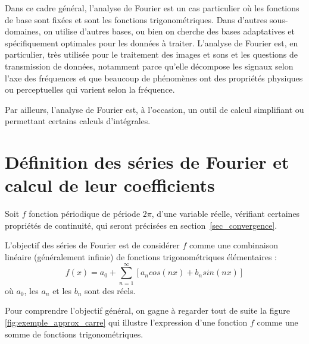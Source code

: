 Dans ce cadre général, l'analyse de Fourier est un cas particulier où les fonctions de base sont fixées et sont les fonctions trigonométriques. Dans d'autres sous-domaines, on utilise d'autres bases, ou bien on cherche des bases adaptatives et spécifiquement optimales pour les données à traiter. L'analyse de Fourier est, en particulier, très utilisée pour le traitement des images et sons et les questions de transmission de données, notamment parce qu'elle décompose les signaux selon l'axe des fréquences et que beaucoup de phénomènes ont des propriétés physiques ou perceptuelles qui varient selon la fréquence.


Par ailleurs, l'analyse de Fourier est, à l'occasion, un outil de calcul simplifiant ou permettant certains calculs d'intégrales.


\section{Définition des séries de Fourier et calcul de leur coefficients}

Soit
 $f$ fonction périodique de période $2\pi$, d'une variable réelle, vérifiant certaines propriétés de continuité, qui seront précisées en section~\ref{sec_convergence}.



\begin{boxedminipage}{14.5cm}
L'objectif des séries de Fourier est de considérer $f$ comme une
combinaison linéaire (généralement infinie) de fonctions trigonométriques élémentaires :
\begin{equation}
f(x)=a_0+\sum_{n=1}^{\infty}[a_n cos(nx) + b_n sin(nx)]
\label{defseries}
\end{equation}
où $a_0$, les $a_n$ et les $b_n$ sont des réels.
\end{boxedminipage}

Pour comprendre l'objectif général, on gagne à regarder tout de suite la figure \ref{fig:exemple_approx_carre} qui illustre l'expression d'une fonction $f$ comme une somme de fonctions trigonométriques.

